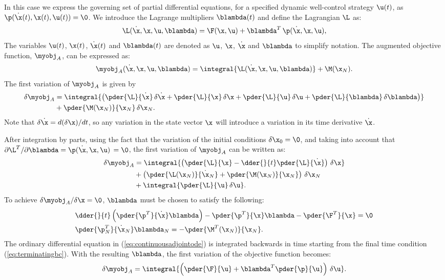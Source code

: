 In this case we express the governing set of partial differential
equations, for a specified dynamic well-control strategy $\u(t)$, as $\p(\dot{\x}(t), \x(t), \u(t) ) = \0$.  
We introduce the Lagrange multipliers $\blambda(t)$  and define the Lagrangian $\L$ as:
%
\begin{align}
  \label{eq:lagrangian}
  \L(\dot{\x}, \x, \u, \blambda) = \F(\x, \u) + \blambda^T \, \p(\dot{\x}, \x, \u ),
\end{align}
%
The
variables $\u(t)$, $\x(t)$, $\dot{\x}(t)$ and $\blambda(t)$ are denoted
as $\u$, $\x$, $\dot{\x}$ and $\blambda$ to simplify notation. The
augmented objective function, $\myobj_A$, can be expressed as:
%
\begin{align}
  \myobj_A(\dot{\x}, \x, \u, \blambda) = \integral{\L(\dot{\x}, \x, \u, \blambda)} + \M(\x_N).
\end{align}
%
The first variation of $\myobj_A$ is given by
%
\begin{align}
\label{eq:firstvariation}
  \delta \myobj_A
  &= \integral{
    \left (
    \pder{\L}{\dot{\x}} \, \delta \dot{\x}
  + \pder{\L}{\x} \, \delta \x
  + \pder{\L}{\u} \, \delta \u
  + \pder{\L}{\blambda} \, \delta \blambda \right ) }
  \nonumber \\
  &+ \pder{\M(\x_N)}{\x_N} \, \delta \x_N.
\end{align}
%
Note that $\delta \dot{\x} = d (\delta \x) / d t$, so any variation in
the state vector $\x$ will introduce a
variation in its time derivative $\dot{\x}$.

After integration by parts, using the fact that the variation of the initial conditions $\delta \x_0 = \0$, and
taking into account that $\partial \L^T / \partial \blambda = \p(\dot \x, \x, \u) \, = \0$,
the first variation of $\myobj_A$ can be written as:
%
\begin{align}
\label{eq:augmentedobjective}
  \delta \myobj_A
  &= \integral{
    \left(
      \pder{\L}{\x}  -\dder{}{t} \pder{\L}{\dot{\x} }
    \right) \, \delta \x} \nonumber \\
 &+ \left ( \pder{\L(\x_N)}{\dot{\x}_N} + \pder{\M(\x_N)}{\x_N} \right )
  \, \delta \x_N \nonumber \\
  &+ \integral{ \pder{\L}{\u} \, \delta \u }.
\end{align}
%
To achieve $\delta \myobj_A / \delta \x=\0$, $\blambda$ must be chosen
to satisfy the following:
%
\begin{align}
\label{eq:continuousadjointode}
  &\dder{}{t} \left ( \pder{ \p^T }{\dot \x} \blambda \right )
    - \pder{\p^T}{\x} \blambda - \pder{\F^T}{\x} = \0
\\
\label{eq:terminatingbc}
&\pder{\p^T_N}{\dot{\x}_N} \blambda_N = -\pder{\M^T(\x_N)}{\x_N}.
\end{align}
%
The ordinary differential equation in (\ref{eq:continuousadjointode}) is integrated backwards in
time starting from the final time condition
(\ref{eq:terminatingbc}). With the resulting $\blambda$, the first variation of the objective function becomes:
\begin{align}
  \delta \myobj_A = \integral{ \left ( \pder{\F}{\u} + \blambda^T
      \pder{\p}{\u} \right ) \, \delta \u}.
\end{align}


